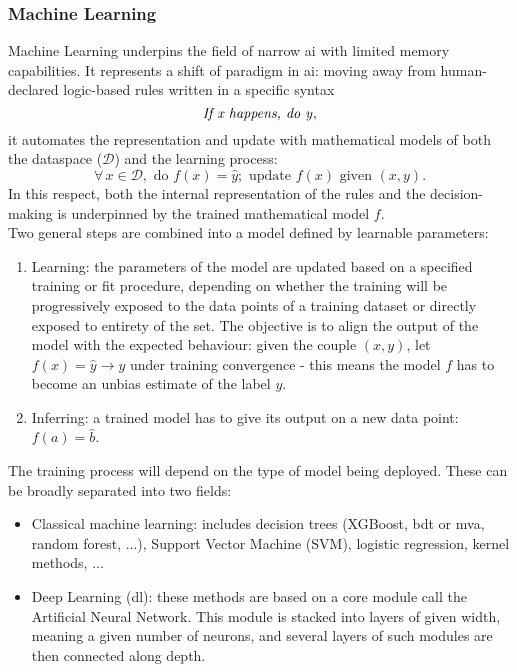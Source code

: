 \subsubsection{Machine Learning} 
Machine Learning underpins the field of narrow \gls{ai} with limited memory capabilities. It represents a shift of paradigm in \gls{ai}: moving away from human-declared logic-based rules written in a specific syntax \[\textrm{\textit{If x happens, do y}},\] it automates the representation and update with mathematical models of both the dataspace ($\mathcal{D}$) and the learning process: \[\forall\, x \in \mathcal{D}, \textrm{ do }f(x) = \hat{y}; \textrm{ update }f(x) \textrm{ given } (x, y).\] In this respect, both the internal representation of the rules and the decision-making is underpinned by the trained mathematical model $f$.\\
Two general steps are combined into a model defined by learnable parameters: 
\begin{enumerate}
    \item Learning: the parameters of the model are updated based on a specified training or fit procedure, depending on whether the training will be progressively exposed to the data points of a training dataset or directly exposed to entirety of the set. The objective is to align the output of the model with the expected behaviour: given the couple $(x, y)$, let $f(x) = \hat{y} \rightarrow y$ under training convergence - this means the model $f$ has to become an unbias estimate of the label $y$. 
    \item Inferring: a trained model has to give its output on a new data point: $f(a) = \hat{b}$.
\end{enumerate}
The training process will depend on the type of model being deployed. These can be broadly separated into two fields:
\begin{itemize}
    \item Classical machine learning: includes decision trees (XGBoost, \gls{bdt} or \gls{mva}, random forest, ...), Support Vector Machine (SVM), logistic regression, kernel methods, ...
    \item Deep Learning (\gls{dl}): these methods are based on a core module call the Artificial Neural Network. This module is stacked into layers of given width, meaning a given number of neurons, and several layers of such modules are then connected along depth. 
\end{itemize}

